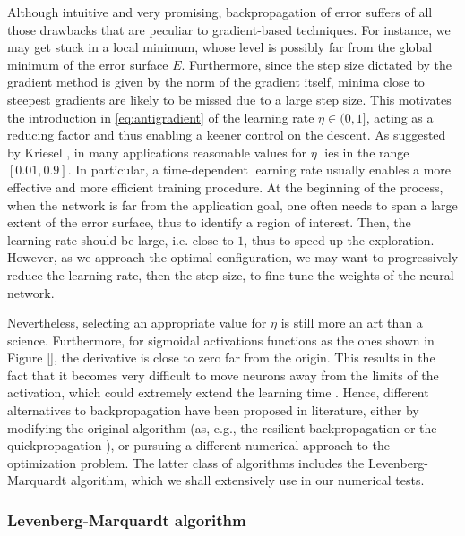\documentclass[11pt, a4paper]{report}
\numberwithin{equation}{chapter}
\theoremstyle{theorem}
\theoremstyle{definition}
\numberwithin{figure}{section}
\begin{document}
		Although intuitive and very promising, backpropagation of error suffers of all those drawbacks that are peculiar to gradient-based techniques. For instance, we may get stuck in a local minimum, whose level is possibly far from the global minimum of the error surface $E$. Furthermore, since the step size dictated by the gradient method is given by the norm of the gradient itself, minima close to steepest gradients are likely to be missed due to a large step size. This motivates the introduction in \eqref{eq:antigradient} of the learning rate $\eta \in (0,1]$, acting as a reducing factor and thus enabling a keener control on the descent. As suggested by Kriesel \cite{Kri}, in many applications reasonable values for $\eta$ lies in the range $[0.01,0.9]$. In particular, a time-dependent learning rate usually enables a more effective and more efficient training procedure. At the beginning of the process, when the network is far from the application goal, one often needs to span a large extent of the error surface, thus to identify a region of interest. Then, the learning rate should be large, i.e. close to $1$, thus to speed up the exploration. However, as we approach the optimal configuration, we may want to progressively reduce the learning rate, then the step size, to fine-tune the weights of the neural network. 
		
		Nevertheless, selecting an appropriate value for $\eta$ is still more an art than a science. Furthermore, for sigmoidal activations functions as the ones shown in Figure \ref{}, the derivative is close to zero far from the origin. This results in the fact that it becomes very difficult to move neurons away from the limits of the activation, which could extremely extend the learning time \cite{Kri}. Hence, different alternatives to backpropagation have been proposed in literature, either by modifying the original algorithm (as, e.g., the resilient backpropagation \cite{RB93} or the quickpropagation \cite{Fah88}), or pursuing a different numerical approach to the optimization problem. The latter class of algorithms includes the Levenberg-Marquardt algorithm, which we shall extensively use in our numerical tests.
				
		\subsubsection{Levenberg-Marquardt algorithm}
		\label{section:Levenberg-Marquardt algorithm}
		
\end{document}
